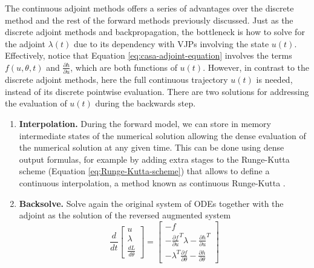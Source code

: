 The continuous adjoint methods offers a series of advantages over the discrete method and the rest of the forward methods previously discussed. 
Just as the discrete adjoint methods and backpropagation, the bottleneck is how to solve for the adjoint $\lambda(t)$ due to its dependency with VJPs involving the state $u(t)$.
Effectively, notice that Equation \eqref{eq:casa-adjoint-equation} involves the terms $f(u, \theta, t)$ and $\frac{\partial h}{\partial u}$, which are both functions of $u(t)$. 
However, in contrast to the discrete adjoint methods, here the full continuous trajectory $u(t)$ is needed, instead of its discrete pointwise evaluation. 
There are two solutions for addressing the evaluation of $u(t)$ during the backwards step.
\begin{enumerate}[label=(\roman*)]
    \item \textbf{Interpolation.} During the forward model, we can store in memory intermediate states of the numerical solution allowing the dense evaluation of the numerical solution at any given time. 
    This can be done using dense output formulas, for example by adding extra stages to the Runge-Kutta scheme (Equation \eqref{eq:Runge-Kutta-scheme}) that allows to define a continuous interpolation, a method known as continuous Runge-Kutta \cite{hairer-solving-2, Alexe_Sandu_2009}. 
    \item \textbf{Backsolve.} Solve again the original system of ODEs together with the adjoint as the solution of the reversed augmented system \cite{chen_neural_2019}
    \begin{equation}
    \frac{d}{dt}
    \begin{bmatrix}
       u \\
       \lambda \\
       \frac{dL}{d\theta}
    \end{bmatrix}
    = 
    \begin{bmatrix}
       -f \\
       - \frac{\partial f}{\partial u}^T \lambda - \frac{\partial h}{\partial u}^T \\
       - \lambda^T \frac{\partial f}{\partial \theta} - \frac{\partial h}{\partial \theta}
    \end{bmatrix}

\end{equation}
\end{enumerate}

